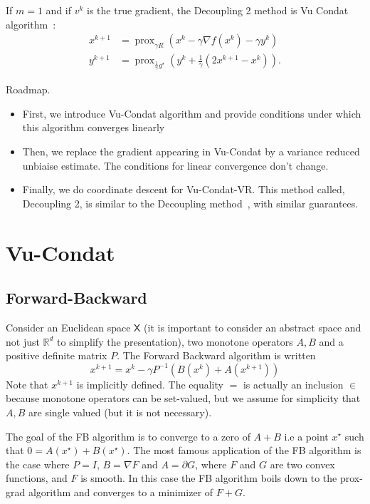\documentclass{article}
\DeclareMathOperator{\prox}{prox}
\newcommand{\bR}{{\mathbb R}}
\newcommand{\sX}{{\mathsf X}}
\theoremstyle{definition}
\begin{document}
If $m=1$ and if $v^k$ is the true gradient, the Decoupling 2 method is Vu Condat algorithm~\cite{con-jota13}:
\begin{align}
    x^{k+1}   &= \prox_{\gamma R}(x^k - \gamma \nabla f(x^k) - \gamma y^k)\\
    y^{k+1} &= \prox_{\frac{1}{\gamma} g^\star}(y^k + \frac{1}{\gamma}(2x^{k+1}-x^k)).
\end{align}



Roadmap.
\begin{itemize}
    \item First, we introduce Vu-Condat algorithm and provide conditions under which this algorithm converges linearly
    \item Then, we replace the gradient appearing in Vu-Condat by a variance reduced unbiaise estimate. The conditions for linear convergence don't change.
    \item Finally, we do coordinate descent for Vu-Condat-VR. This method called, Decoupling 2, is similar to the Decoupling method~\cite{mishchenko2019stochastic}, with similar guarantees. 
\end{itemize}

\section{Vu-Condat}
\subsection{Forward-Backward}
Consider an Euclidean space $\sX$ (it is important to consider an abstract space and not just $\bR^d$ to simplify the presentation), two monotone operators $A,B$ and a positive definite matrix $P$.
The Forward Backward algorithm is written
\begin{equation}
    \label{eq:FB}
    x^{k+1} = x^k - \gamma P^{-1} (B(x^k) + A(x^{k+1}))
\end{equation}
Note that $x^{k+1}$ is implicitly defined. The equality $=$ is actually an inclusion $\in$ because monotone operators can be set-valued, but we assume for simplicity that $A,B$ are single valued (but it is not necessary).

The goal of the FB algorithm is to converge to a zero of $A+B$ i.e a point $x^\star$ such that $0 = A(x^\star) + B(x^\star)$. The most famous application of the FB algorithm is the case where $P=I$, $B = \nabla F$ and $A = \partial G$, where $F$ and $G$ are two convex functions, and $F$ is smooth. In this case the FB algorithm boils down to the prox-grad algorithm and converges to a minimizer of $F+G$.
\end{document}

